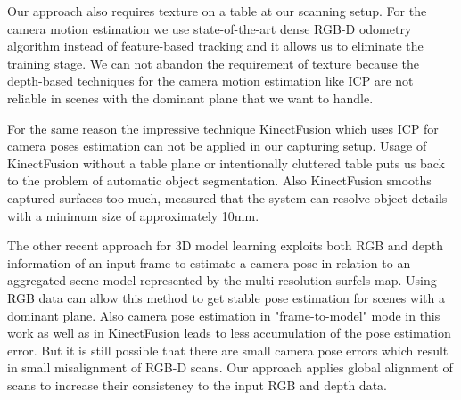 \documentclass[letterpaper, 10 pt, conference]{ieeeconf}  %
\begin{document}
Our approach also requires 
texture on a table at our scanning setup. For the camera motion estimation 
we use state-of-the-art dense RGB-D odometry algorithm \cite{steinbrucker2011real} 
instead of feature-based tracking 
and it allows us to eliminate the training stage.
We can not abandon the requirement of texture because the depth-based
techniques for the camera motion estimation like ICP \cite{besl1992method} 
are not reliable in scenes with the dominant plane \cite{rusinkiewicz2001efficient} 
that we want to handle.


For the same reason
the impressive technique KinectFusion \cite{newcombe2011kinectfusion} 
which uses ICP for camera poses estimation can not be applied in our capturing setup.
Usage of KinectFusion without a table plane or intentionally cluttered table 
puts us back to the problem of automatic object segmentation.
Also KinectFusion smooths captured surfaces too much, \cite{meister2012when} measured that
the system can resolve object details with a minimum size of approximately 10mm.

The other recent approach \cite{stuckler2012model} for 3D model learning 
exploits both RGB and depth information of an input frame to estimate a camera pose 
in relation to an aggregated scene model represented by the multi-resolution surfels map.
Using RGB data can allow this method to get stable pose estimation
for scenes with a dominant plane. Also camera pose estimation in "frame-to-model" mode
in this work as well as in KinectFusion leads to less accumulation of the pose estimation error. 
But it is still possible that there are small camera pose errors which result in
small misalignment of RGB-D scans. Our approach applies global alignment of scans
to increase their consistency to the input RGB and depth data.
\end{document}
